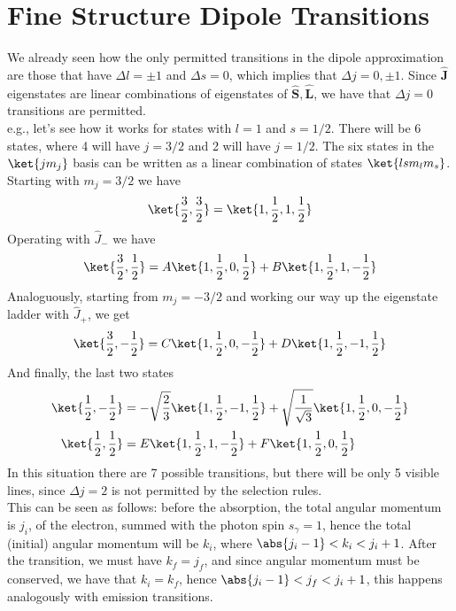 \documentclass[a4paper, 11pt]{book}
\renewcommand{\vec}[1]{\mathbf{#1}}
\newcommand{\1}{\opr{\mathds{1}}}
\newcommand{\opr}[1]{\hat{#1}}
\newcommand{\ladopru}[1]{\opr{#1}_{+}}
\newcommand{\ladoprd}[1]{\opr{#1}_{-}}
\newcommand{\vecopr}[1]{\opr{\vec{#1}}}
\theoremstyle{plain}
\begin{document}
	\section{Fine Structure Dipole Transitions}
	We already seen how the only permitted transitions in the dipole approximation are those that have $\Delta l=\pm1$ and $\Delta s=0$, which implies that $\Delta j=0,\pm1$. Since $\vecopr{J}$ eigenstates are linear combinations of eigenstates of $\vecopr{S},\vecopr{L}$, we have that $\Delta j=0$ transitions are permitted.\\
	e.g., let's see how it works for states with $l=1$ and $s=1/2$. There will be 6 states, where 4 will have $j=3/2$ and 2 will have $j=1/2$. The six states in the $\ket{jm_j}$ basis can be written as a linear combination of states $\ket{lsm_lm_s}$. Starting with $m_j=3/2$ we have
	\begin{equation*}
		\ket{\frac{3}{2},\frac{3}{2}}=\ket{1,\frac{1}{2},1,\frac{1}{2}}
	\end{equation*}
	Operating with $\ladoprd{J}$ we have
	\begin{equation*}
		\ket{\frac{3}{2},\frac{1}{2}}=A\ket{1,\frac{1}{2},0,\frac{1}{2}}+B\ket{1,\frac{1}{2},1,-\frac{1}{2}}
	\end{equation*}
	Analoguously, starting from $m_j=-3/2$ and working our way up the eigenstate ladder with $\ladopru{J}$, we get
	\begin{equation*}
		\ket{\frac{3}{2},-\frac{1}{2}}=C\ket{1,\frac{1}{2},0,-\frac{1}{2}}+D\ket{1,\frac{1}{2},-1,\frac{1}{2}}
	\end{equation*}
	And finally, the last two states
	\begin{equation*}
		\begin{aligned}
			\ket{\frac{1}{2},-\frac{1}{2}}&=-\sqrt{\frac{2}{3}}\ket{1,\frac{1}{2},-1,\frac{1}{2}}+\sqrt{\frac{1}{\sqrt{3}}}\ket{1,\frac{1}{2},0,-\frac{1}{2}}\\
			\ket{\frac{1}{2},\frac{1}{2}}&=E\ket{1,\frac{1}{2},1,-\frac{1}{2}}+F\ket{1,\frac{1}{2},0,\frac{1}{2}}
		\end{aligned}
	\end{equation*}
	In this situation there are 7 possible transitions, but there will be only 5 visible lines, since $\Delta j=2$ is not permitted by the selection rules.\\
	This can be seen as follows: before the absorption, the total angular momentum is $j_i$, of the electron, summed with the photon spin $s_{\gamma}=1$, hence the total (initial) angular momentum will be $k_i$, where $\abs{j_i-1}<k_i<j_i+1$. After the transition, we must have $k_f=j_f$, and since angular momentum must be conserved, we have that $k_i=k_f$, hence $\abs{j_i-1}<j_f<j_i+1$, this happens analogously with emission transitions.
\end{document}
